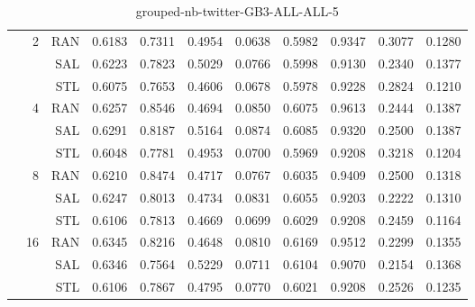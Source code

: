 \begin{center}
\begin{table}[htbp]
\begin{center}
\begin{tabular}{ | r | r | r | r | r | r | r | r | r | r | r |}
 & \multirow{3}{*}{2} & RAN & 0.6183 & 0.7311 & 0.4954 & 0.0638 & 0.5982 & 0.9347 & 0.3077 & 0.1280\\ \cline{3-11}
 &   & SAL & 0.6223 & 0.7823 & 0.5029 & 0.0766 & 0.5998 & 0.9130 & 0.2340 & 0.1377\\ \cline{3-11}
 &   & STL & 0.6075 & 0.7653 & 0.4606 & 0.0678 & 0.5978 & 0.9228 & 0.2824 & 0.1210\\ \cline{2-11}
 & \multirow{3}{*}{4} & RAN & 0.6257 & 0.8546 & 0.4694 & 0.0850 & 0.6075 & 0.9613 & 0.2444 & 0.1387\\ \cline{3-11}
 &   & SAL & 0.6291 & 0.8187 & 0.5164 & 0.0874 & 0.6085 & 0.9320 & 0.2500 & 0.1387\\ \cline{3-11}
 &   & STL & 0.6048 & 0.7781 & 0.4953 & 0.0700 & 0.5969 & 0.9208 & 0.3218 & 0.1204\\ \cline{2-11}
 & \multirow{3}{*}{8} & RAN & 0.6210 & 0.8474 & 0.4717 & 0.0767 & 0.6035 & 0.9409 & 0.2500 & 0.1318\\ \cline{3-11}
 &   & SAL & 0.6247 & 0.8013 & 0.4734 & 0.0831 & 0.6055 & 0.9203 & 0.2222 & 0.1310\\ \cline{3-11}
 &   & STL & 0.6106 & 0.7813 & 0.4669 & 0.0699 & 0.6029 & 0.9208 & 0.2459 & 0.1164\\ \cline{2-11}
 & \multirow{3}{*}{16} & RAN & 0.6345 & 0.8216 & 0.4648 & 0.0810 & 0.6169 & 0.9512 & 0.2299 & 0.1355\\ \cline{3-11}
 &   & SAL & 0.6346 & 0.7564 & 0.5229 & 0.0711 & 0.6104 & 0.9070 & 0.2154 & 0.1368\\ \cline{3-11}
 &   & STL & 0.6106 & 0.7867 & 0.4795 & 0.0770 & 0.6021 & 0.9208 & 0.2526 & 0.1235\\ \cline{2-11}
\hline
\end{tabular}
\caption{grouped-nb-twitter-GB3-ALL-ALL-5}
\end{center}
 \end{table}
\end{center}

